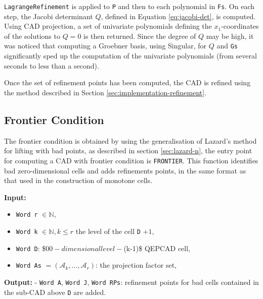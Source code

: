 \documentclass[
]{book}
\providecommand{\tightlist}{%
  \setlength{\itemsep}{0pt}\setlength{\parskip}{0pt}}
\theoremstyle{definition}
\theoremstyle{definition}
\theoremstyle{definition}
\theoremstyle{definition}
\theoremstyle{remark}
\begin{document}
\texttt{LagrangeRefinement} is applied to \texttt{P} and then to each polynomial in \texttt{Fs}. On each step, the Jacobi determinant \(Q\), defined in Equation \eqref{eq:jacobi-det}, is computed. Using CAD projection, a set of univariate polynomials defining the \(x_1\)-coordinates of the solutions to \(Q = 0\) is then returned. Since the degree of \(Q\) may be high, it was noticed that computing a Groebner basis, using Singular, for \(Q\) and \texttt{Gs} significantly sped up the computation of the univariate polynomials (from several seconds to less than a second).

Once the set of refinement points has been computed, the CAD is refined using the method described in Section \ref{sec:implementation-refinement}.

\hypertarget{frontier-condition}{%
\subsection{Frontier Condition}\label{frontier-condition}}

The frontier condition is obtained by using the generalisation of Lazard's method for lifting with bad points, as described in section \ref{sec:lazard-n}, the entry point for computing a CAD with frontier condition is \texttt{FRONTIER}. This function identifies bad zero-dimensional cells and adds refinements points, in the same format as that used in the construction of monotone cells.

\textbf{Input:}

\begin{itemize}
\tightlist
\item
  \texttt{Word\ r} \(\in \mathbb{N}\),
\item
  \texttt{Word\ k} \(\in \mathbb{N}, k \le r\) the level of the cell \texttt{D} \(+ 1\),
\item
  \texttt{Word\ D}: \$0\(0-dimensional level-\)(k-1)\$ QEPCAD cell,
\item
  \texttt{Word\ As} \(= (\mathcal{A}_k,\ldots,\mathcal{A}_r)\): the projection factor set,
\end{itemize}

\textbf{Output:}
- \texttt{Word\ A}, \texttt{Word\ J}, \texttt{Word\ RPs}: refinement points for bad cells contained in the sub-CAD above \texttt{D} are added.
\end{document}
